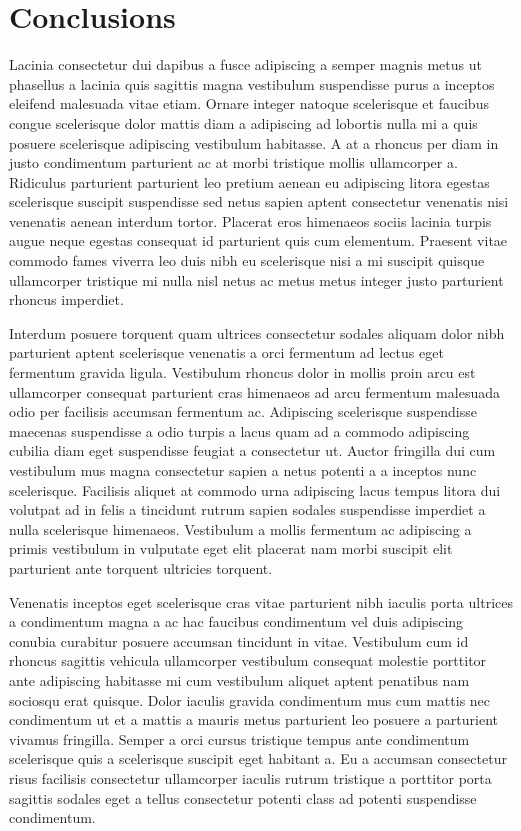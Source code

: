 \section{Conclusions}
Lacinia consectetur dui dapibus a fusce adipiscing a semper magnis metus ut phasellus a lacinia quis sagittis magna vestibulum suspendisse purus a inceptos eleifend malesuada vitae etiam. Ornare integer natoque scelerisque et faucibus congue scelerisque dolor mattis diam a adipiscing ad lobortis nulla mi a quis posuere scelerisque adipiscing vestibulum habitasse. A at a rhoncus per diam in justo condimentum parturient ac at morbi tristique mollis ullamcorper a. Ridiculus parturient parturient leo pretium aenean eu adipiscing litora egestas scelerisque suscipit suspendisse sed netus sapien aptent consectetur venenatis nisi venenatis aenean interdum tortor. Placerat eros himenaeos sociis lacinia turpis augue neque egestas consequat id parturient quis cum elementum. Praesent vitae commodo fames viverra leo duis nibh eu scelerisque nisi a mi suscipit quisque ullamcorper tristique mi nulla nisl netus ac metus metus integer justo parturient rhoncus imperdiet.
\par
Interdum posuere torquent quam ultrices consectetur sodales aliquam dolor nibh parturient aptent scelerisque venenatis a orci fermentum ad lectus eget fermentum gravida ligula. Vestibulum rhoncus dolor in mollis proin arcu est ullamcorper consequat parturient cras himenaeos ad arcu fermentum malesuada odio per facilisis accumsan fermentum ac. Adipiscing scelerisque suspendisse maecenas suspendisse a odio turpis a lacus quam ad a commodo adipiscing cubilia diam eget suspendisse feugiat a consectetur ut. Auctor fringilla dui cum vestibulum mus magna consectetur sapien a netus potenti a a inceptos nunc scelerisque. Facilisis aliquet at commodo urna adipiscing lacus tempus litora dui volutpat ad in felis a tincidunt rutrum sapien sodales suspendisse imperdiet a nulla scelerisque himenaeos. Vestibulum a mollis fermentum ac adipiscing a primis vestibulum in vulputate eget elit placerat nam morbi suscipit elit parturient ante torquent ultricies torquent.
\par
Venenatis inceptos eget scelerisque cras vitae parturient nibh iaculis porta ultrices a condimentum magna a ac hac faucibus condimentum vel duis adipiscing conubia curabitur posuere accumsan tincidunt in vitae. Vestibulum cum id rhoncus sagittis vehicula ullamcorper vestibulum consequat molestie porttitor ante adipiscing habitasse mi cum vestibulum aliquet aptent penatibus nam sociosqu erat quisque. Dolor iaculis gravida condimentum mus cum mattis nec condimentum ut et a mattis a mauris metus parturient leo posuere a parturient vivamus fringilla. Semper a orci cursus tristique tempus ante condimentum scelerisque quis a scelerisque suscipit eget habitant a. Eu a accumsan consectetur risus facilisis consectetur ullamcorper iaculis rutrum tristique a porttitor porta sagittis sodales eget a tellus consectetur potenti class ad potenti suspendisse condimentum.

